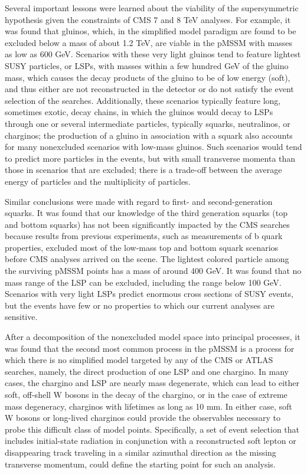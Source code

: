 Several important lessons were learned about the viability of the supersymmetric hypothesis given the constraints of CMS 7 and 8 TeV analyses. For example, it was found that gluinos, which, in the simplified model paradigm are found to be excluded below a mass of about 1.2 TeV, are viable in the pMSSM with masses as low as 600 GeV. Scenarios with these very light gluinos tend to feature lightest SUSY particles, or LSPs, with masses within a few hundred GeV of the gluino mass, which causes the decay products of the gluino to be of low energy (soft), and thus either are not reconstructed in the detector or do not satisfy the event selection of the searches. Additionally, these scenarios typically feature long, sometimes exotic, decay chains, in which the gluinos would decay to LSPs through one or several intermediate particles, typically squarks, neutralinos, or charginos; the production of a gluino in association with a squark also accounts for many nonexcluded scenarios with low-mass gluinos. Such scenarios would tend to predict more particles in the events, but with small transverse momenta than those in scenarios that are excluded; there is a trade-off between the average energy of particles and the multiplicity of particles.

Similar conclusions were made with regard to first- and second-generation squarks. It was found that our knowledge of the third generation squarks (top and bottom squarks) has not been significantly impacted by the CMS searches because  results from previous experiments, such as measurements of b quark properties, excluded most of the low-mass top and bottom squark scenarios before CMS analyses arrived on the scene. The lightest colored particle among the surviving pMSSM points has a mass of around 400 GeV. It was found that no mass range of the LSP can be excluded, including the range below 100 GeV. Scenarios with very light LSPs predict enormous cross sections of SUSY events, but the events have few or no properties to which our current analyses are sensitive. 

After a decomposition of the nonexcluded model space into principal processes, it was found that the second most common process in the pMSSM is a process for which there is no simplified model targeted by any of the CMS or ATLAS searches, namely, the direct production of one LSP and one chargino. In many cases, the chargino and LSP are nearly mass degenerate, which can lead to either soft, off-shell W bosons in the decay of the chargino, or in the case of extreme mass degeneracy, charginos with lifetimes as long as 10 mm. In either case, soft W bosons or long-lived charginos could provide the observables necessary to probe this difficult class of model points. Specifically, a set of event selection that includes initial-state radiation in conjunction with a reconstructed soft lepton or disappearing track traveling in a similar azimuthal direction as the missing transverse momentum, could define the starting point for such an analysis. 

